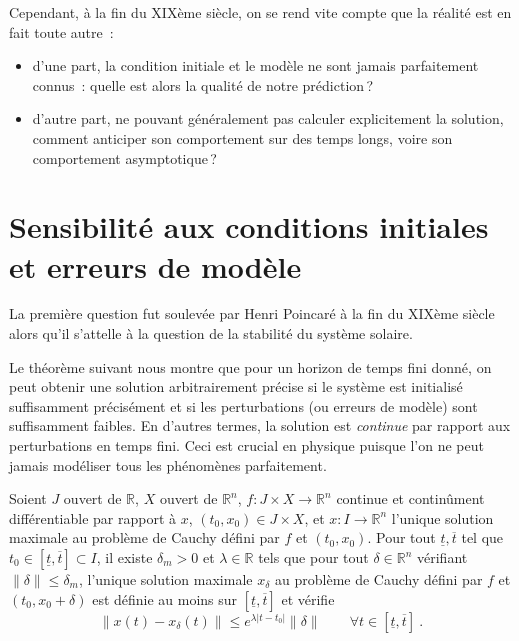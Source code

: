 Cependant, à la fin du XIXème siècle, on se rend vite compte que la
réalité est en fait toute autre~:

\begin{itemize}
\item
  d'une part, la condition initiale et le modèle ne sont jamais
  parfaitement connus~: quelle est alors la qualité de notre
  prédiction\,?
\item
  d'autre part, ne pouvant généralement pas calculer explicitement la
  solution, comment anticiper son comportement sur des temps longs,
  voire son comportement asymptotique\,?
\end{itemize}

\hypertarget{sensibilituxe9-aux-conditions-initiales-et-erreurs-de-moduxe8le}{%
\section{Sensibilité aux conditions initiales et erreurs de
modèle}\label{sensibilituxe9-aux-conditions-initiales-et-erreurs-de-moduxe8le}}

La première question fut soulevée par Henri Poincaré à la fin du XIXème
siècle alors qu'il s'attelle à la question de la stabilité du système
solaire.

Le théorème suivant nous montre que pour un horizon de temps fini donné,
on peut obtenir une solution arbitrairement précise si le système est
initialisé suffisamment précisément et si les perturbations (ou erreurs
de modèle) sont suffisamment faibles. En d'autres termes, la solution
est \emph{continue} par rapport aux perturbations en temps fini. Ceci
est crucial en physique puisque l'on ne peut jamais modéliser tous les
phénomènes parfaitement.

\hypertarget{theo_reg_CI}{}
\begin{theoreme}\label{theo_reg_CI}
Soient \(J\) ouvert de \(\mathbb{R}\), \(X\) ouvert de
\(\mathbb{R}^{n}\), \(f: J\times X \to \mathbb{R}^n\) continue et
continûment différentiable par rapport à \(x\),
\((t_0,x_0)\in J\times X\), et \(x:I\to\mathbb{R}^n\) l'unique solution
maximale au problème de Cauchy défini par \(f\) et \((t_0,x_0)\). Pour
tout \(\underline{t},\overline{t}\) tel que
\(t_0\in\left[\underline{t},\overline{t} \right]\subset I\), il existe
\(\delta_m>0\) et \(\lambda\in \mathbb{R}\) tels que pour tout
\(\delta\in \mathbb{R}^n\) vérifiant \(\|\delta\|\leq \delta_m\), l'unique
solution maximale \(x_\delta\) au problème de Cauchy défini par \(f\) et
\((t_0,x_0+\delta)\) est définie au moins sur
\(\left[\underline{t},\overline{t} \right]\) et vérifie \[
\|x(t)-x_{\delta}(t)\| \leq e^{\lambda |t-t_0|} \|\delta\| \qquad \forall t\in \left[\underline{t},\overline{t} \right] \ .
\]
\end{theoreme}


